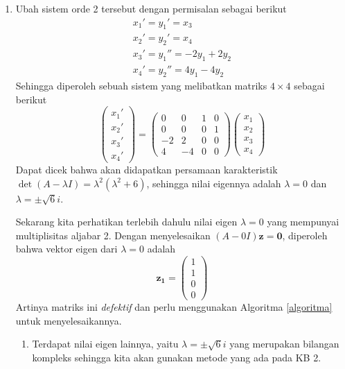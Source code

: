 \documentclass[a4paper]{article}
\theoremstyle{definisi}
\numberwithin{equation}{section}
\begin{document}
\begin{enumerate}
\begin{enumerate}[label=Langkah \arabic*: ,leftmargin=*]
\begin{equation*}
\begin{split}
\begin{pmatrix}
            3\\0\\0\\0
          \end{pmatrix}\frac{t^2}{2}e^{t}\right)
        \end{split}
      \end{equation*}
    \end{enumerate}
    \item Ubah sistem orde 2 tersebut dengan permisalan sebagai berikut
    \begin{align*}
      x_1'=y_1'=x_3\\
      x_2'=y_2'=x_4\\
      x_3'=y_1''=-2y_1+2y_2\\
      x_4'=y_2''=4y_1-4y_2
    \end{align*}
    Sehingga diperoleh sebuah sistem yang melibatkan matriks $4\times 4$ sebagai berikut
    \begin{equation*}
      \begin{pmatrix}
        x_1'\\x_2'\\x_3'\\x_4'
      \end{pmatrix}=\begin{pmatrix}
        0&0&1&0\\
        0&0&0&1\\
        -2&2&0&0\\
        4&-4&0&0
      \end{pmatrix}\begin{pmatrix}
        x_1\\x_2\\x_3\\x_4
      \end{pmatrix}
    \end{equation*}
    Dapat dicek bahwa akan didapatkan persamaan karakteristik $\det(A-\lambda I)=\lambda^2(\lambda^2+6)$, sehingga nilai eigennya adalah $\lambda=0$ dan $\lambda=\pm\sqrt{6}i$.

    Sekarang kita perhatikan terlebih dahulu nilai eigen $\lambda=0$ yang mempunyai multiplisitas aljabar 2. Dengan menyelesaikan $(A-0I)\mathbf{z}=\mathbf{0}$, diperoleh bahwa vektor eigen dari $\lambda=0$ adalah
    \begin{equation*}
      \mathbf{z_1}=\begin{pmatrix}
        1\\1\\0\\0
      \end{pmatrix}
    \end{equation*}
    Artinya matriks ini \textit{defektif} dan perlu menggunakan Algoritma \ref{algoritma} untuk menyelesaikannya.
    \begin{enumerate}[label=Langkah \arabic*: ,leftmargin=*]
      \item Terdapat nilai eigen lainnya, yaitu $\lambda=\pm\sqrt{6}i$ yang merupakan bilangan kompleks sehingga kita akan gunakan metode yang ada pada KB 2.
      

\end{enumerate}
\end{enumerate}
\end{document}
